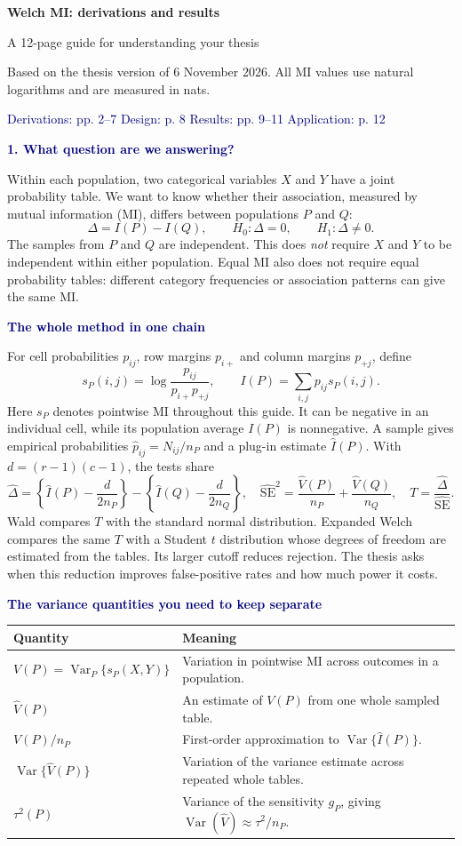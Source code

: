 \documentclass[11pt,a4paper]{article}
\newcommand{\Var}{\operatorname{Var}}
\newcommand{\Ih}{\widehat I}
\newcommand{\Vh}{\widehat V}
\newcommand{\Dh}{\widehat\Delta}
\newcommand{\SEh}{\widehat{\mathrm{SE}}}
\newcommand{\subhead}[1]{\par\medskip\textbf{\textcolor{navy}{#1}}\par\smallskip}
\begin{document}

{\LARGE\bfseries\color{navy}Welch MI: derivations and results}\par
{\large A 12-page guide for understanding your thesis}\par
{\small Based on the thesis version of 6 November 2026. All MI values use natural logarithms and are measured in nats.}
\par{\small\textcolor{navy}{Derivations: pp. 2--7 \quad Design: p. 8 \quad Results: pp. 9--11 \quad Application: p. 12}}

\subhead{1. What question are we answering?}
Within each population, two categorical variables \(X\) and \(Y\) have a joint probability table. We want to know whether their association, measured by mutual information (MI), differs between populations \(P\) and \(Q\):
\[
 \Delta=I(P)-I(Q),\qquad H_0:\Delta=0,\qquad H_1:\Delta\ne0.
\]
The samples from \(P\) and \(Q\) are independent. This does \emph{not} require \(X\) and \(Y\) to be independent within either population. Equal MI also does not require equal probability tables: different category frequencies or association patterns can give the same MI.

\subhead{The whole method in one chain}
For cell probabilities \(p_{ij}\), row margins \(p_{i+}\) and column margins \(p_{+j}\), define
\[
 s_P(i,j)=\log\frac{p_{ij}}{p_{i+}p_{+j}},\qquad
 I(P)=\sum_{i,j}p_{ij}s_P(i,j).
\]
Here \(s_P\) denotes pointwise MI throughout this guide. It can be negative in an individual cell, while its population average \(I(P)\) is nonnegative. A sample gives empirical probabilities \(\widehat p_{ij}=N_{ij}/n_P\) and a plug-in estimate \(\Ih(P)\). With \(d=(r-1)(c-1)\), the tests share
\[
 \Dh=\left\{\Ih(P)-\frac{d}{2n_P}\right\}
       -\left\{\Ih(Q)-\frac{d}{2n_Q}\right\},\quad
 \SEh^2=\frac{\Vh(P)}{n_P}+\frac{\Vh(Q)}{n_Q},\quad
 T=\frac{\Dh}{\SEh}.
\]
Wald compares \(T\) with the standard normal distribution. Expanded Welch compares the same \(T\) with a Student \(t\) distribution whose degrees of freedom are estimated from the tables. Its larger cutoff reduces rejection. The thesis asks when this reduction improves false-positive rates and how much power it costs.

\subhead{The variance quantities you need to keep separate}
\begin{tabularx}{\linewidth}{@{}lX@{}}\toprule
Quantity & Meaning\\\midrule
\(V(P)=\Var_P\{s_P(X,Y)\}\) & Variation in pointwise MI across outcomes in a population.\\
\(\Vh(P)\) & An estimate of \(V(P)\) from one whole sampled table.\\
\(V(P)/n_P\) & First-order approximation to \(\Var\{\Ih(P)\}\).\\
\(\Var\{\Vh(P)\}\) & Variation of the variance estimate across repeated whole tables.\\
\(\tau^2(P)\) & Variance of the sensitivity \(g_P\), giving \(\Var(\Vh)\approx\tau^2/n_P\).\\\bottomrule
\end{tabularx}
\end{document}
